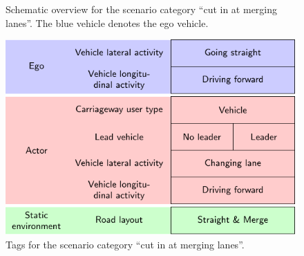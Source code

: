 \setlength{\figurewidth}{22.5em}
\begin{figure}
	\centering
	
	\caption{Schematic overview for the scenario category ``cut in at merging lanes''. The blue vehicle denotes the ego vehicle.}
	\label{fig:scheme cut in}		
\end{figure}
\begin{figure}
	\centering
	\includegraphics[width=\linewidth]{figures/cut-in_tags}
	\caption{Tags for the scenario category ``cut in at merging lanes''.}
	\label{fig:tags cut in}
\end{figure}



